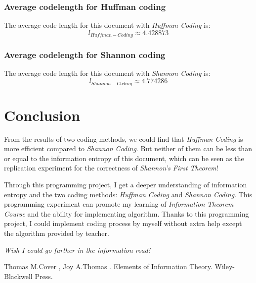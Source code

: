 \documentclass[12pt]{article} %
\numberwithin{equation}{section}
\begin{document}
\subsubsection{Average codelength for Huffman coding}

The average code length for this document with \emph{Huffman Coding} is:
\begin{equation}\label{ep:eqs}
  l_{Huffman-Coding} \approx 4.428873
\end{equation}


\subsubsection{Average codelength for Shannon coding}

The average code length for this document with \emph{Shannon Coding} is:
\begin{equation}\label{ep:eqs}
  l_{Shannon-Coding} \approx 4.774286
\end{equation}

\newpage

\section{Conclusion} %
From the results of two coding methods, we could find that \emph{Huffman Coding} is more efficient compared to \emph{Shannon Coding}. But neither of them can be less than or equal to the information entropy of this document, which can be seen as the replication experiment for the correctness of \emph{Shannon's First Theorem}!

Through this programming project, I get a deeper understanding of information entropy and the two coding methods: \emph{Huffman Coding} and \emph{Shannon Coding}. This programming experiment can promote my learning of \emph{Information Theorem Course} and the ability for implementing algorithm. Thanks to this programming project, I could implement coding process by myself without extra help except the algorithm provided by teacher.

\vspace{1\baselineskip}

\emph{Wish I could go further in the information road!}

\newpage
\begin{thebibliography}{99} %

Thomas M.Cover ,  Joy A.Thomas .
\newblock  Elements of Information Theory.
\newblock  Wiley-Blackwell Press.
\end{thebibliography}
\end{document}
